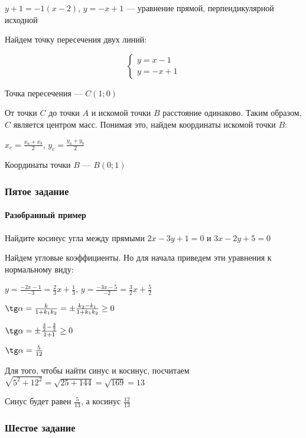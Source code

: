 \documentclass{article}
\begin{document}
\begin{flushleft}
$y + 1 = -1 (x - 2)$, $y = -x + 1$ — уравнение прямой, перпендикулярной исходной

\bigskip

Найдем точку пересечения двух линий:

\begin{equation}
    \begin{cases}
        y = x - 1 \\
        y = -x + 1
    \end{cases}
\end{equation}

Точка пересечения — $C(1; 0)$

От точки $C$ до точки $A$ и искомой точки $B$ расстояние одинаково. Таким образом, $C$ является центром масс. Понимая это, найдем координаты искомой точки $B$:

\hspace{5mm} $x_c = \frac{x_a + x_b}{2}$, $y_c = \frac{y_a + y_b}{2}$

Координаты точки $B$ — $B(0; 1)$


\subsubsection{Пятое задание}

\paragraph{Разобранный пример}

Найдите косинус угла между прямыми $2x - 3y + 1 = 0$ и $3x - 2y + 5 = 0$

Найдем угловые коэффициенты. Но для начала приведем эти уравнения к нормальному виду:

$y = \frac{-2x - 1}{-3} = \frac{2}{3}x + \frac{1}{3}$, $y = \frac{-3x - 5}{-2} = \frac{3}{2}x + \frac{5}{2}$

\bigskip

$\tg \alpha = \frac{k}{1 + k_1 k_2} = \pm \frac{k_2 - k_1}{1 + k_1 k_2} \ge 0$

$\tg \alpha = \pm \frac{\frac{3}{2} - \frac{2}{3}}{1 + 1} \ge 0$

$\tg \alpha = \frac{5}{12}$

\bigskip

Для того, чтобы найти синус и косинус, посчитаем $\sqrt{5^2 + 12^2} = \sqrt{25 + 144} = \sqrt{169} = 13$

Синус будет равен $\frac{5}{13}$, а косинус $\frac{12}{13}$


\subsubsection{Шестое задание}


\end{flushleft}
\end{document}
